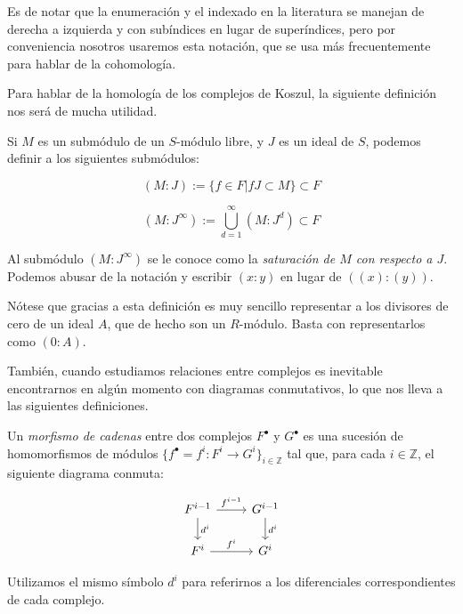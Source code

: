Es de notar que la enumeración y el indexado en la literatura se manejan de derecha a izquierda y con subíndices en lugar de superíndices, pero por conveniencia nosotros usaremos esta notación, que se usa más frecuentemente para hablar de la cohomología.

Para hablar de la homología de los complejos de Koszul, la siguiente definición nos será de mucha utilidad.

\begin{definition}

Si $M$ es un submódulo de un $S$-módulo libre, y $J$ es un ideal de $S$, podemos definir a los siguientes submódulos:

$$(M:J) := \{f \in F|fJ\subset M\}\subset F$$

$$(M:J^\infty) := \bigcup_{d=1}^\infty(M:J^d)\subset F$$

Al submódulo $(M:J^\infty)$ se le conoce como la \emph{saturación de $M$ con respecto a $J$}. Podemos abusar de la notación y escribir $(x:y)$ en lugar de $((x):(y))$.

\end{definition}

Nótese que gracias a esta definición es muy sencillo representar a los divisores de cero de un ideal $A$, que de hecho son un $R$-módulo. Basta con representarlos como $(0:A)$.

También, cuando estudiamos relaciones entre complejos es inevitable encontrarnos en algún momento con diagramas conmutativos, lo que nos lleva a las siguientes definiciones.

\begin{definition}

Un \emph{morfismo de cadenas} entre dos complejos $F^{\bullet}$ y $G^{\bullet}$ es una sucesión de homomorfismos de módulos $\{f^{\bullet} = {f^i:F^i \rightarrow G^i}\}_{i \in \mathbb{Z}}$ tal que, para cada $i \in \mathbb{Z}$, el siguiente diagrama conmuta:

\[
\begin{tikzcd}
F^{i-1} \arrow[d,"d^i"] \arrow[r,"f^{i-1}"] & G^{i-1} \arrow[d,"d^i"]\\
F^i \arrow[r,"f^i"] & G^i
\end{tikzcd}
\]

Utilizamos el mismo símbolo $d^i$ para referirnos a los diferenciales correspondientes de cada complejo.

\end{definition}

